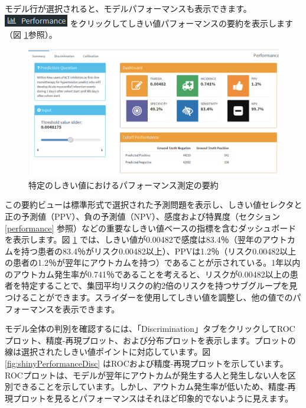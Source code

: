 \documentclass[
  11pt]{book}
\theoremstyle{definition}
\theoremstyle{definition}
\theoremstyle{definition}
\theoremstyle{definition}
\theoremstyle{remark}
\begin{document}
モデル行が選択されると、モデルパフォーマンスも表示できます。\includegraphics{images/PatientLevelPrediction/performance.png} をクリックしてしきい値パフォーマンスの要約を表示します（図 \ref{fig:shinyPerformanceSum}参照）。

\begin{figure}

{\centering \includegraphics[width=1\linewidth]{images/PatientLevelPrediction/shiny/shinyPerformanceSum} 

}

\caption{特定のしきい値におけるパフォーマンス測定の要約}\label{fig:shinyPerformanceSum}
\end{figure}

この要約ビューは標準形式で選択された予測問題を表示し、しきい値セレクタと正の予測値（PPV）、負の予測値（NPV）、感度および特異度（セクション \ref{performance} 参照）などの重要なしきい値ベースの指標を含むダッシュボードを表示します。図 \ref{fig:shinyPerformanceSum} では、しきい値が0.00482で感度は83.4％（翌年のアウトカムを持つ患者の83.4％がリスク0.00482以上）、PPVは1.2％（リスク0.00482以上の患者の1.2％が翌年にアウトカムを持つ）であることが示されている。1年以内のアウトカム発生率が0.741％であることを考えると、リスクが0.00482以上の患者を特定することで、集団平均リスクの約2倍のリスクを持つサブグループを見つけることができます。スライダーを使用してしきい値を調整し、他の値でのパフォーマンスを表示できます。

モデル全体の判別を確認するには、「Discrimination」タブをクリックしてROCプロット、精度-再現プロット、および分布プロットを表示します。プロットの線は選択されたしきい値ポイントに対応しています。図 \ref{fig:shinyPerformanceDisc} はROCおよび精度-再現プロットを示しています。ROCプロットは、モデルが翌年にアウトカムが発生する人と発生しない人を区別できることを示しています。しかし、アウトカム発生率が低いため、精度-再現プロットを見るとパフォーマンスはそれほど印象的でないように見えます。
\end{document}
